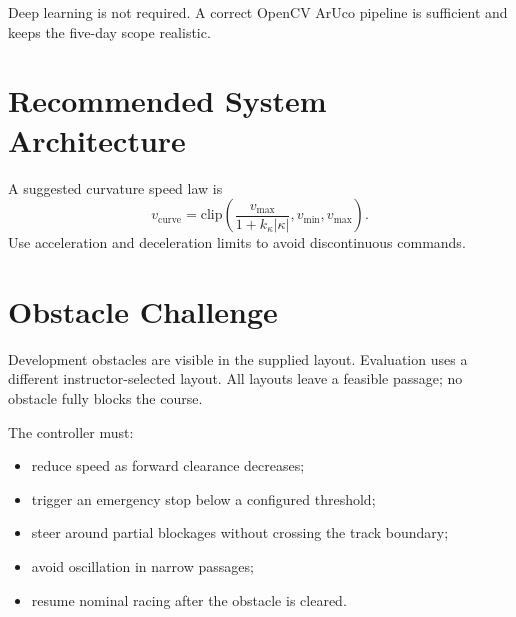 \documentclass[11pt,a4paper]{article}
\begin{document}
Deep learning is not required. A correct OpenCV ArUco pipeline is sufficient and keeps the five-day scope realistic.

\section{Recommended System Architecture}
\begin{center}
\end{center}

A suggested curvature speed law is
\[
v_{\mathrm{curve}}=\mathrm{clip}\left(\frac{v_{\max}}{1+k_{\kappa}|\kappa|},v_{\min},v_{\max}\right).
\]
Use acceleration and deceleration limits to avoid discontinuous commands.

\section{Obstacle Challenge}
Development obstacles are visible in the supplied layout. Evaluation uses a different instructor-selected layout. All layouts leave a feasible passage; no obstacle fully blocks the course.

The controller must:
\begin{itemize}
  \item reduce speed as forward clearance decreases;
  \item trigger an emergency stop below a configured threshold;
  \item steer around partial blockages without crossing the track boundary;
  \item avoid oscillation in narrow passages;
  \item resume nominal racing after the obstacle is cleared.
\end{itemize}
\end{document}

